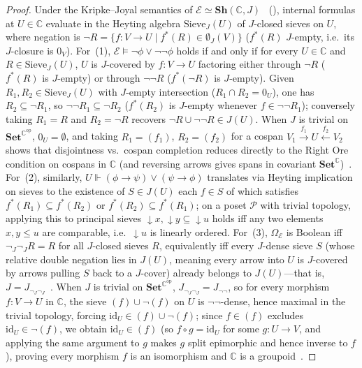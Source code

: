 \documentclass[10pt,twoside,openright]{book}
\theoremstyle{crmplain}
\theoremstyle{crmdef}
\theoremstyle{crmremark}
\begin{document}
\begin{proof}
Under the Kripke--Joyal semantics of $\mathcal{E} \simeq \mathbf{Sh}(\mathbb{C}, J)$~\cite[\S D4.6]{Johnstone02} (\cite[Ch.~III, Ch.~VI]{MacLaneMoerdijk92}), internal formulas at $U \in \mathbb{C}$ evaluate in the Heyting algebra $\mathrm{Sieve}_J(U)$ of $J$-closed sieves on $U$, where negation is $\neg R = \{f : V \to U \mid f^*(R) \in \emptyset_J(V)\}$ ($f^*(R)$ $J$-empty, i.e.\ its $J$-closure is $0_V$).
For~(1), $\mathcal{E} \models \neg\phi \lor \neg\neg\phi$ holds if and only if for every $U \in \mathbb{C}$ and $R \in \mathrm{Sieve}_J(U)$, $U$ is $J$-covered by $f : V \to U$ factoring either through $\neg R$ ($f^*(R)$ is $J$-empty) or through $\neg\neg R$ ($f^*(\neg R)$ is $J$-empty). Given $R_1, R_2 \in \mathrm{Sieve}_J(U)$ with $J$-empty intersection ($R_1 \cap R_2 = 0_U$), one has $R_2 \subseteq \neg R_1$, so $\neg\neg R_1 \subseteq \neg R_2$ ($f^*(R_2)$ is $J$-empty whenever $f \in \neg\neg R_1$); conversely taking $R_1 = R$ and $R_2 = \neg R$ recovers $\neg R \cup \neg\neg R \in J(U)$. When $J$ is trivial on $\mathbf{Set}^{\mathbb{C}^{\mathrm{op}}}$, $0_U = \emptyset$, and taking $R_1 = (f_1)$, $R_2 = (f_2)$ for a cospan $V_1 \xrightarrow{f_1} U \xleftarrow{f_2} V_2$ shows that disjointness vs.\ cospan completion reduces directly to the Right Ore condition on cospans in $\mathbb{C}$ (and reversing arrows gives spans in covariant $\mathbf{Set}^{\mathbb{C}}$)~\cite[\S D4.6, Lemma~D4.6.3]{Johnstone02}.
For~(2), similarly, $U \Vdash (\phi \to \psi) \lor (\psi \to \phi)$ translates via Heyting implication on sieves to the existence of $S \in J(U)$ each $f \in S$ of which satisfies $f^*(R_1) \subseteq f^*(R_2)$ or $f^*(R_2) \subseteq f^*(R_1)$; on a poset $\mathcal{P}$ with trivial topology, applying this to principal sieves $\downarrow x, \downarrow y \subseteq \downarrow u$ holds iff any two elements $x, y \le u$ are comparable, i.e.\ $\downarrow u$ is linearly ordered.
For~(3), $\Omega_{\mathcal{E}}$ is Boolean iff $\neg_J\neg_J R = R$ for all $J$-closed sieves $R$, equivalently iff every $J$-dense sieve $S$ (whose relative double negation lies in $J(U)$, meaning every arrow into $U$ is $J$-covered by arrows pulling $S$ back to a $J$-cover) already belongs to $J(U)$---that is, $J = J_{\neg_J \neg_J}$~\cite[\S A4.5]{Johnstone02}. When $J$ is trivial on $\mathbf{Set}^{\mathbb{C}^{\mathrm{op}}}$, $J_{\neg_J \neg_J} = J_{\neg\neg}$, so for every morphism $f : V \to U$ in $\mathbb{C}$, the sieve $(f) \cup \neg(f)$ on $U$ is $\neg\neg$-dense, hence maximal in the trivial topology, forcing $\mathrm{id}_U \in (f) \cup \neg(f)$; since $f \in (f)$ excludes $\mathrm{id}_U \in \neg(f)$, we obtain $\mathrm{id}_U \in (f)$ (so $f \circ g = \mathrm{id}_U$ for some $g : U \to V$, and applying the same argument to $g$ makes $g$ split epimorphic and hence inverse to $f$), proving every morphism $f$ is an isomorphism and $\mathbb{C}$ is a groupoid~\cite[\S A4.5]{Johnstone02}.

\end{proof}
\end{document}
